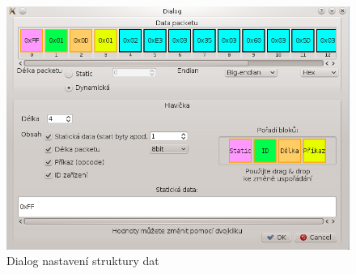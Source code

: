 \documentclass[12pt, a4paper, oneside]{article}
\begin{document}


\newpage
\begin{figure}[h]
\begin{center}
\includegraphics[scale=0.7]{img/analyzer_struct.png}
\caption{Dialog nastavení struktury dat}
\label{Analyzer_struct}
\end{center}
\end{figure}

\newpage
\setlength{\voffset}{0mm} %
\pagestyle{plain}
\end{document}
